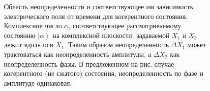 \begin{figure}
\centering



\caption{Область неопределенности и соответствующее им зависимость
  электрического поля от времени для когерентного
  состояния. Комплексное число $\alpha$,
  соответствующее рассматриваемому состоянию $\left|\alpha\right>$ на
  комплексной плоскости, задаваемой $X_1$ и $X_2$ лежит вдоль оси
  $X_1$. Таким образом неопределенность $\Delta X_1$ может
  трактоваться как неопределенность амплитуды, а $\Delta X_2$ как
  неопределенность фазы. В предложенном на рис. случае когерентного
  (не сжатого) состояния, неопределенность по фазе и амплитуде одинаковая.}
\label{figPart3Squeezed_1}
\end{figure}
